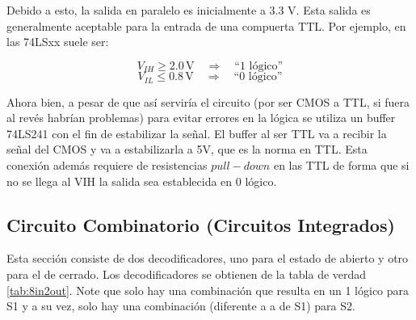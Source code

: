 \documentclass[conference]{IEEEtran}  %
\begin{document}
Debido a esto, la salida en paralelo es inicialmente a 3.3 V. Esta salida es generalmente aceptable para la entrada de una compuerta TTL. Por ejemplo, en las 74LSxx suele ser:

\[
V_{IH} \geq 2.0 \,\text{V} \quad \Rightarrow \quad \text{``1 lógico''}
\]
\[
V_{IL} \leq 0.8 \,\text{V} \quad \Rightarrow \quad \text{``0 lógico''}
\]

Ahora bien, a pesar de que así serviría el circuito (por ser CMOS a TTL, si fuera al revés habrían problemas) para evitar errores en la lógica se utiliza un buffer 74LS241 con el fin de estabilizar la señal. El buffer al ser TTL va a recibir la señal del CMOS y va a estabilizarla a 5V, que es la norma en TTL. Esta conexión además requiere de resistencias $pull-down$ en las TTL de forma que si no se llega al VIH la salida sea establecida en 0 lógico. 

\subsection{Circuito Combinatorio (Circuitos Integrados)}

Esta sección consiste de dos decodificadores, uno para el estado de abierto y otro para el de cerrado. Los decodificadores se obtienen de la tabla de verdad \ref{tab:8in2out}. Note que solo hay una combinación que resulta en un 1 lógico para S1 y a su vez, solo hay una combinación (diferente a a de S1) para S2.

\begin{table}[h!]
\centering
{}
\caption{Tabla de Verdad para decodificador de 8 bits a 2 salidas de 1 bit}
\label{tab:8in2out}
\end{table}
\end{document}
